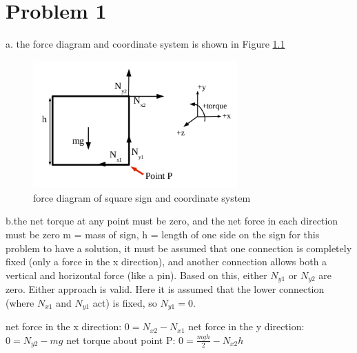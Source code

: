 \chapter{Problem 1}
\label{Problem 1}
a. the force diagram and coordinate system is shown in Figure \ref{fig:forceDiagram}\newline

\begin{figure}[h]
	\centering
	\includegraphics[width=0.7\textwidth]{figures/exam4problem1partA.png}
	\caption{force diagram of square sign and coordinate system}
	\label{fig:forceDiagram}
\end{figure}

b.the net torque at any point must be zero, and the net force in each direction must be zero \newline
m = mass of sign, h = length of one side on the sign\newline
for this problem to have a solution, it must be assumed that one connection is\newline
completely fixed (only a force in the x direction), and another connection\newline
allows both a vertical and horizontal force (like a pin).  Based\newline
on this, either $N_{y1}$ or $N_{y2}$ are zero.  Either approach\newline
is valid. Here it is assumed that the lower connection (where $N_{x1}$ and\newline
$N_{y1}$ act) is fixed, so $N_{y1} = 0$.\newline

net force in the x direction: $0 = N_{x2} - N_{x1}$\newline
net force in the y direction: $0 = N_{y2} - mg$\newline
net torque about point P: $0 = \frac{mgh}{2} - N_{x2}h$\newline

